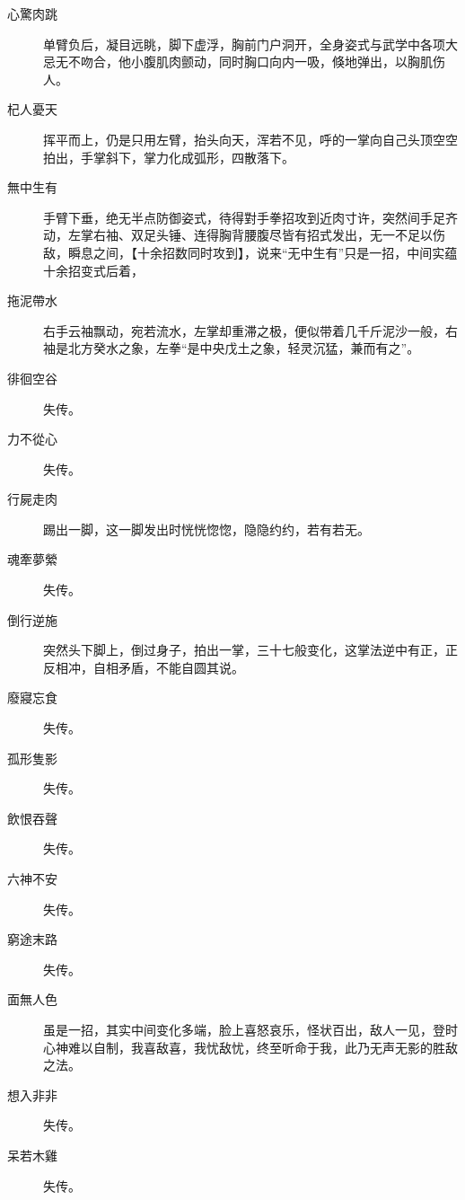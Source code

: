 \begin{description}
\item[心驚肉跳] 单臂负后，凝目远眺，脚下虚浮，胸前门户洞开，全身姿式与武学中各项大忌无不吻合，他小腹肌肉颤动，同时胸口向内一吸，倏地弹出，以胸肌伤人。
\item[杞人憂天] 挥平而上，仍是只用左臂，抬头向天，浑若不见，呼的一掌向自己头顶空空拍出，手掌斜下，掌力化成弧形，四散落下。
\item[無中生有] 手臂下垂，绝无半点防御姿式，待得對手拳招攻到近肉寸许，突然间手足齐动，左掌右袖、双足头锤、连得胸背腰腹尽皆有招式发出，无一不足以伤敌，瞬息之间，【十余招数同时攻到】，说来“无中生有”只是一招，中间实蕴十余招变式后着，
\item[拖泥帶水] 右手云袖飘动，宛若流水，左掌却重滞之极，便似带着几千斤泥沙一般，右袖是北方癸水之象，左拳“是中央戊土之象，轻灵沉猛，兼而有之”。
\item[徘徊空谷] 失传。
\item[力不從心] 失传。
\item[行屍走肉] 踢出一脚，这一脚发出时恍恍惚惚，隐隐约约，若有若无。
\item[魂牽夢縈] 失传。
\item[倒行逆施] 突然头下脚上，倒过身子，拍出一掌，三十七般变化，这掌法逆中有正，正反相冲，自相矛盾，不能自圆其说。
\item[廢寢忘食] 失传。
\item[孤形隻影] 失传。
\item[飲恨吞聲] 失传。
\item[六神不安] 失传。
\item[窮途末路] 失传。
\item[面無人色] 虽是一招，其实中间变化多端，脸上喜怒哀乐，怪状百出，敌人一见，登时心神难以自制，我喜敌喜，我忧敌忧，终至听命于我，此乃无声无影的胜敌之法。
\item[想入非非] 失传。 
\item[呆若木雞] 失传。
\end{description}

